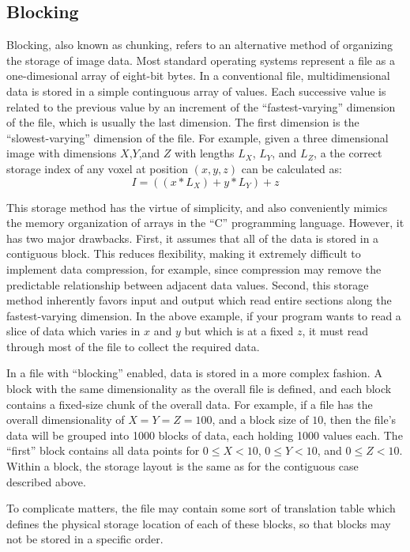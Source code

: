 \documentclass{article}
\begin{document}
\subsection{Blocking}
Blocking, also known as chunking, refers to an alternative method of
organizing the storage of image data.  Most standard operating systems
represent a file as a one-dimesional array of eight-bit bytes.  In a
conventional file, multidimensional data is stored in a simple
continguous array of values.  Each successive value is related to the
previous value by an increment of the ``fastest-varying'' dimension of
the file, which is usually the last dimension.  The first dimension is
the ``slowest-varying'' dimension of the file.  For example, given a
three dimensional image with dimensions $X$,$Y$,and $Z$ with lengths
$L_X$, $L_Y$, and $L_Z$, a the correct storage index of any 
voxel at position $(x,y,z)$ can be calculated as:
\begin{equation}
I = ((x * L_X) + y * L_Y) + z
\end{equation}

This storage method has the virtue of simplicity, and also
conveniently mimics the memory organization of arrays in the ``C''
programming language.  However, it has two major drawbacks.  First, it
assumes that all of the data is stored in a contiguous block.  This
reduces flexibility, making it extremely difficult to implement data
compression, for example, since compression may remove the predictable
relationship between adjacent data values.  Second, this storage
method inherently favors input and output which read entire sections
along the fastest-varying dimension. In the above example, if your
program wants to read a slice of data which varies in $x$ and $y$ but
which is at a fixed $z$, it must read through most of the file to
collect the required data.

In a file with ``blocking'' enabled, data is stored in a more complex
fashion.  A block with the same dimensionality as the overall file is
defined, and each block contains a fixed-size chunk of the overall data.
For example, if a file has the overall dimensionality of $X = Y = Z = 100$,
and a block size of $10$, then the file's data will be grouped into 1000 blocks
of data, each holding 1000 values each.  The ``first'' block contains all 
data points for $0 \le X < 10$, $0 \le Y < 10$, and $0 \le Z < 10$.  Within
a block, the storage layout is the same as for the contiguous case described
above.

To complicate matters, the file may contain some sort of translation
table which defines the physical storage location of each of these
blocks, so that blocks may not be stored in a specific order.
\end{document}
